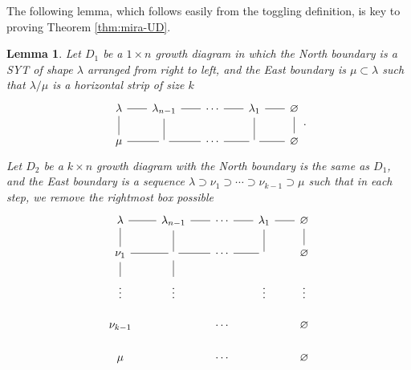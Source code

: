 \documentclass[12pt,a4paper]{article}
\theoremstyle{plain}
\newtheorem{lemma}[thm]{Lemma}
\theoremstyle{definition}
\theoremstyle{remark}
\begin{document}
    The following lemma, which follows easily from the toggling definition, is key to proving Theorem \ref{thm:mira-UD}.

    \begin{lemma}\label{lem:replace}
        Let $D_1$ be a $1\times n$ growth diagram in which the North boundary is a SYT of shape $\lambda$ arranged from right to left, and the East boundary is $\mu \subset \lambda$ such that $\lambda /\mu$ is a horizontal strip of size $k$
        \[\begin{tikzcd}[sep=scriptsize]
        	\lambda & {\lambda_{n-1}} & \cdots & {\lambda_1} & \varnothing \\
        	\mu & {} & \cdots & {} & \varnothing
        	\arrow[no head, from=1-1, to=1-2]
        	\arrow[no head, from=1-1, to=2-1]
        	\arrow[no head, from=1-2, to=1-3]
        	\arrow[no head, from=1-3, to=1-4]
        	\arrow[no head, from=1-4, to=1-5]
        	\arrow[no head, from=1-5, to=2-5]
        	\arrow[no head, from=2-1, to=2-2]
        	\arrow[no head, from=2-2, to=2-3]
        	\arrow[no head, from=2-3, to=2-4]
        	\arrow[no head, from=2-4, to=2-5]
        	\arrow[no head, from=1-2, to=2-2]
        	\arrow[no head, from=1-4, to=2-4]
        \end{tikzcd}.\]
        Let $D_2$ be a $k\times n$ growth diagram with the North boundary is the same as $D_1$, and the East boundary is a sequence $\lambda \supset \nu_1 \supset \cdots \supset \nu_{k-1} \supset \mu$ such that in each step, we remove the rightmost box possible
        \[\begin{tikzcd}[sep=scriptsize]
        	\lambda & {\lambda_{n-1}} & \cdots & {\lambda_1} & \varnothing \\
        	{\nu_1} & {} & \cdots & {} & \varnothing \\
        	\vdots & \vdots && \vdots & \vdots \\
        	{\nu_{k-1}} & {} & \cdots & {} & \varnothing \\
        	\mu & {} & \cdots & {} & \varnothing
        	\arrow[no head, from=1-1, to=1-2]
        	\arrow[no head, from=1-1, to=2-1]
        	\arrow[no head, from=1-2, to=1-3]
        	\arrow[no head, from=1-2, to=2-2]
        	\arrow[no head, from=1-3, to=1-4]
        	\arrow[no head, from=1-4, to=1-5]
        	\arrow[no head, from=1-4, to=2-4]
        	\arrow[no head, from=1-5, to=2-5]
        	\arrow[no head, from=2-1, to=2-2]
        	\arrow[no head, from=2-1, to=3-1]
        	\arrow[no head, from=2-2, to=2-3]
        	\arrow[no head, from=2-2, to=3-2]
        	\arrow[no head, from=2-3, to=2-4]

\end{tikzcd}\]
\end{lemma}
\end{document}
